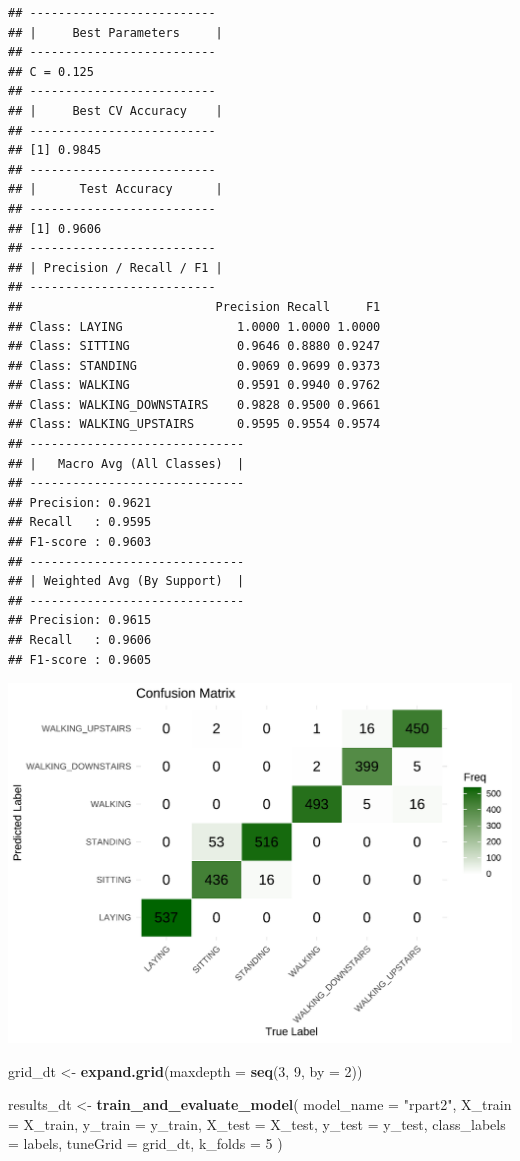 \documentclass[
]{article}
\newenvironment{Shaded}{\begin{snugshade}}{\end{snugshade}}
\newcommand{\AttributeTok}[1]{\textcolor[rgb]{0.13,0.29,0.53}{#1}}
\newcommand{\DecValTok}[1]{\textcolor[rgb]{0.00,0.00,0.81}{#1}}
\newcommand{\FunctionTok}[1]{\textcolor[rgb]{0.13,0.29,0.53}{\textbf{#1}}}
\newcommand{\NormalTok}[1]{#1}
\newcommand{\OtherTok}[1]{\textcolor[rgb]{0.56,0.35,0.01}{#1}}
\newcommand{\StringTok}[1]{\textcolor[rgb]{0.31,0.60,0.02}{#1}}
\begin{document}
\begin{verbatim}
## --------------------------
## |     Best Parameters     |
## --------------------------
## C = 0.125
## --------------------------
## |     Best CV Accuracy    |
## --------------------------
## [1] 0.9845
## --------------------------
## |      Test Accuracy      |
## --------------------------
## [1] 0.9606
## --------------------------
## | Precision / Recall / F1 |
## --------------------------
##                           Precision Recall     F1
## Class: LAYING                1.0000 1.0000 1.0000
## Class: SITTING               0.9646 0.8880 0.9247
## Class: STANDING              0.9069 0.9699 0.9373
## Class: WALKING               0.9591 0.9940 0.9762
## Class: WALKING_DOWNSTAIRS    0.9828 0.9500 0.9661
## Class: WALKING_UPSTAIRS      0.9595 0.9554 0.9574
## ------------------------------
## |   Macro Avg (All Classes)  |
## ------------------------------
## Precision: 0.9621
## Recall   : 0.9595
## F1-score : 0.9603
## ------------------------------
## | Weighted Avg (By Support)  |
## ------------------------------
## Precision: 0.9615
## Recall   : 0.9606
## F1-score : 0.9605
\end{verbatim}

\includegraphics{report_files/figure-latex/unnamed-chunk-26-1.pdf}

\begin{Shaded}
\begin{Highlighting}[]
\NormalTok{grid\_dt }\OtherTok{\textless{}{-}} \FunctionTok{expand.grid}\NormalTok{(}\AttributeTok{maxdepth =} \FunctionTok{seq}\NormalTok{(}\DecValTok{3}\NormalTok{, }\DecValTok{9}\NormalTok{, }\AttributeTok{by =} \DecValTok{2}\NormalTok{))}

\NormalTok{results\_dt }\OtherTok{\textless{}{-}} \FunctionTok{train\_and\_evaluate\_model}\NormalTok{(}
  \AttributeTok{model\_name =} \StringTok{"rpart2"}\NormalTok{,}
  \AttributeTok{X\_train =}\NormalTok{ X\_train,}
  \AttributeTok{y\_train =}\NormalTok{ y\_train,}
  \AttributeTok{X\_test =}\NormalTok{ X\_test,}
  \AttributeTok{y\_test =}\NormalTok{ y\_test,}
  \AttributeTok{class\_labels =}\NormalTok{ labels,}
  \AttributeTok{tuneGrid =}\NormalTok{ grid\_dt,}
  \AttributeTok{k\_folds =} \DecValTok{5}
\NormalTok{)}
\end{Highlighting}
\end{Shaded}
\end{document}
